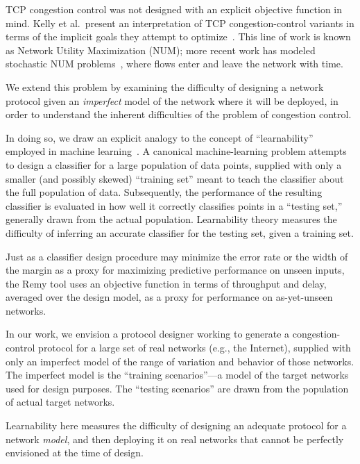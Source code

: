 TCP congestion control was not designed with an explicit objective
function in mind. Kelly et al.~present an interpretation of TCP
congestion-control variants in terms of the implicit goals they
attempt to optimize~\cite{Kelly98}.  This line of work is known as
Network Utility Maximization (NUM); more recent work has modeled
stochastic NUM problems~\cite{stochasticnum}, where flows enter and
leave the network with time.

We extend this problem by examining the difficulty of designing a
network protocol given an \emph{imperfect} model of the network where
it will be deployed, in order to understand the inherent difficulties
of the problem of congestion control.

\begin{comment}
Formally speaking, designing such a protocol is a problem in
sequential decision-making under uncertain and can be modeled as a
Partially-Observable Markov Decision Process~\cite{pomdp}. In that
context, the purpose of this paper is to ask: how well can a protocol
designer ``learn'' the solution to one POMDP or set of networks and
successfully apply the result (a protocol) to a different set of networks?
\end{comment}

In doing so, we draw an explicit analogy to the concept of
``learnability'' employed in machine
learning~\cite{learnable,schapire}. A canonical machine-learning
problem attempts to design a classifier for a large population of data
points, supplied with only a smaller (and possibly skewed) ``training
set'' meant to teach the classifier about the full population of
data. Subsequently, the performance of the resulting classifier is
evaluated in how well it correctly classifies points in a ``testing
set,'' generally drawn from the actual population. Learnability theory
measures the difficulty of inferring an accurate classifier for the
testing set, given a training set.

Just as a classifier design procedure may minimize the error rate or
the width of the margin as a proxy for maximizing predictive
performance on unseen inputs, the Remy tool uses an objective function
in terms of throughput and delay, averaged over the design model, as a
proxy for performance on as-yet-unseen networks.

In our work, we envision a protocol designer working to generate a
congestion-control protocol for a large set of real networks (e.g.,
the Internet), supplied with only an imperfect model of the range of
variation and behavior of those networks. The imperfect model is the
``training scenarios''---a model of the target networks used for design
purposes. The ``testing scenarios'' are drawn from the population of actual
target networks.

Learnability here measures the difficulty of designing an adequate
protocol for a network \emph{model}, and then deploying it on real
networks that cannot be perfectly envisioned at the time of design.

